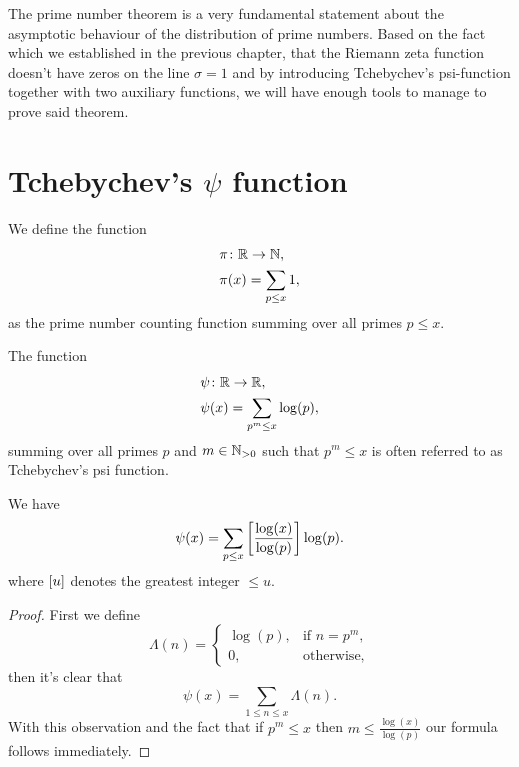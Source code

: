 The prime number theorem is a very fundamental statement about the asymptotic behaviour of the distribution of prime numbers. Based on the fact which we established in the previous chapter, that the Riemann zeta function doesn't have zeros on the line $\sigma = 1$ and by introducing Tchebychev's psi-function together with two auxiliary functions, we will have enough tools to manage to prove said theorem.


\section{Tchebychev's $\psi$ function}


\begin{definition}
	We define the function
\begin{equation*}
\begin{aligned}
	&\pi \colon \mathbb{R} \to \mathbb{N}, \\
	&\pi(x) = \sum _{p \leq x} 1,
\end{aligned}
\end{equation*}
	as the prime number counting function summing over all primes $p \leq x$.
\end{definition}


\begin{definition}
	The function
\begin{equation*}
\begin{aligned}
	&\psi \colon \mathbb{R} \to \mathbb{R}, \\
	&\psi(x) = \sum _{p^m \leq x} \log(p),
\end{aligned}
\end{equation*}
	summing over all primes $p$ and $m \in \mathbb{N}_{> 0}$ such that $p^m \leq x$ is often referred to as Tchebychev's psi function.
\end{definition}


\begin{lemma}
	We have
\begin{equation*}
	\psi(x) = \sum _{p \leq x} \left[\frac{\log(x)}{\log(p)}\right] \log(p).
\end{equation*}
	where $\left[u\right]$ denotes the greatest integer $\leq u$.
\end{lemma}
\begin{proof}
	First we define
\begin{equation*}
	\Lambda(n) =
    	\left\{
    		\begin{array}{ll}
        		\log(p), & \text{if } n = p^m,\\
        		0, & \text{otherwise},
        	\end{array}
		\right.
\end{equation*}
	then it's clear that
\begin{equation*}
	\psi(x) = \sum _{1 \leq n \leq x} \Lambda(n).
\end{equation*}
	With this observation and the fact that if $p^m \leq x$ then $m \leq \frac{\log(x)}{\log(p)}$ our formula follows immediately.
\end{proof}


